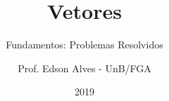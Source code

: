 \title{Vetores}
\subtitle{Fundamentos: Problemas Resolvidos}
\author{Prof. Edson Alves - UnB/FGA}
\date{2019}
